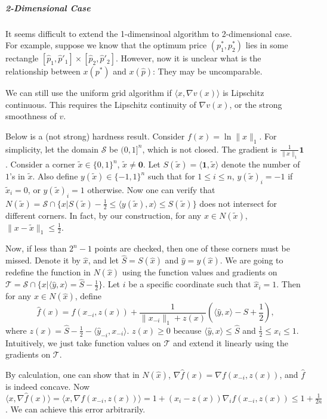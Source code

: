 \documentclass{article}
\begin{document}
\subparagraph{2-Dimensional Case}
It seems difficult to extend the 1-dimensinoal algorithm to 2-dimensional case. For example, suppose we know that the optimum price $(p^*_1,p^*_2)$ lies in some rectangle $[\hat{p}_1,\hat{p}'_1]\times[\hat{p}_2,\hat{p}'_2]$. However, now it is unclear what is the relationship between $x(p^*)$ and $x(\hat{p})$: They may be uncomparable.

We can still use the uniform grid algorithm if $\langle x,\nabla v(x)\rangle$ is Lipschitz continuous. This requires the Lipschitz continuity of $\nabla v(x)$, or the strong smoothness of $v$.

Below is a (not strong) hardness result. Consider $f(x)=\ln \|x\|_1$. For simplicity, let the domain $\mathcal{S}$ be $(0,1]^n$, which is not closed. The gradient is $\frac{1}{\|x\|_1}\mathbf{1}$. Consider a corner $\tilde{x}\in\{0,1\}^n$, $\tilde{x}\ne \mathbf{0}$. Let $S(\tilde{x})=\langle \mathbf{1},\tilde{x}\rangle$ denote the number of $1$'s in $\tilde{x}$. Also define $y(\tilde{x})\in\{-1,1\}^n$ such that for $1\le i\le n$, $y(\tilde{x})_i=-1$ if $\tilde{x}_i=0$, or $y(\tilde{x})_i=1$ otherwise. Now one can verify that $N(\tilde{x})=\mathcal{S}\cap\{x|S(\tilde{x})-\frac{1}{2}\le \langle y(\tilde{x}),x\rangle\le S(\tilde{x})\}$ does not intersect for different corners. In fact, by our construction, for any $x\in N(\tilde{x})$, $\|x-\tilde{x}\|_1\le \frac{1}{2}$.

Now, if less than $2^n-1$ points are checked, then one of these corners must be missed. Denote it by $\hat{x}$, and let $\hat{S}=S(\hat{x})$ and $\hat{y}=y(\hat{x})$. We are going to redefine the function in $N(\hat{x})$ using the function values and gradients on $\mathcal{T}=\mathcal{S}\cap\{x|\langle \hat{y},x\rangle=\hat{S}-\frac{1}{2}\}$. Let $i$ be a specific coordinate such that $\hat{x}_i=1$. Then for any $x\in N(\hat{x})$, define
\begin{equation}
    \hat{f}(x)=f(x_{-i},z(x))+\frac{1}{\|x_{-i}\|_1+z(x)}(\langle\hat{y},x\rangle-S+\frac{1}{2}),
\end{equation}
where $z(x)=\hat{S}-\frac{1}{2}-\langle \hat{y}_{-i},x_{-i}\rangle$. $z(x)\ge0$ because $\langle \hat{y},x\rangle\le\hat{S}$ and $\frac{1}{2}\le x_i\le 1$. Intuitively, we just take function values on $\mathcal{T}$ and extend it linearly using the gradients on $\mathcal{T}$.

By calculation, one can show that in $N(\hat{x})$, $\nabla\hat{f}(x)=\nabla f(x_{-i},z(x))$, and $\hat{f}$ is indeed concave. Now $\langle x,\nabla\hat{f}(x)\rangle=\langle x,\nabla f(x_{-i},z(x))\rangle=1+(x_i-z(x))\nabla_i f(x_{-i},z(x))\le 1+\frac{1}{2n}$. We can achieve this error arbitrarily.
\end{document}
